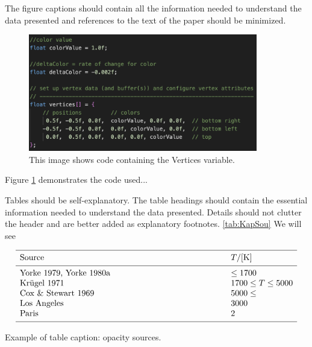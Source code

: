 \documentclass[a4paper,10pt]{article}
\begin{document}
The figure captions should contain all the information needed to 
understand the data presented and references to the text of the paper 
should be minimized.


\begin{figure}[htb]
  \centering
  \includegraphics[width=10cm]{Images/Vertices.png}
     \caption{This image shows code containing the Vertices variable.}
         \label{Fig:Vertices}
\end{figure}

Figure \ref {Fig:Vertices} demonstrates the code used...

Tables should be self-explanatory. The table headings should contain 
the essential information needed to understand the data presented. 
Details should not clutter the header and are better added as explanatory 
footnotes. \ref{tab:KapSou} We will see

\begin{table}[htb]
      
     $$ 
         \begin{array}{p{0.7\linewidth}l}
            \hline
            \noalign{\smallskip}
            Source      &  T / {[\mathrm{K}]} \\
            \noalign{\smallskip}
            \hline
            \noalign{\smallskip}
            Yorke 1979, Yorke 1980a & \leq 1700           \\
            Kr\"ugel 1971           & 1700 \leq T \leq 5000 \\
            Cox \& Stewart 1969     & 5000 \leq             \\
            Los Angeles & 3000\\
            Paris & 2\\
            \noalign{\smallskip}
            \hline
         \end{array}
     $$ 
     \caption[]{Example of table caption: opacity sources.}
         \label{tab:KapSou}
\end{table}
\end{document}
